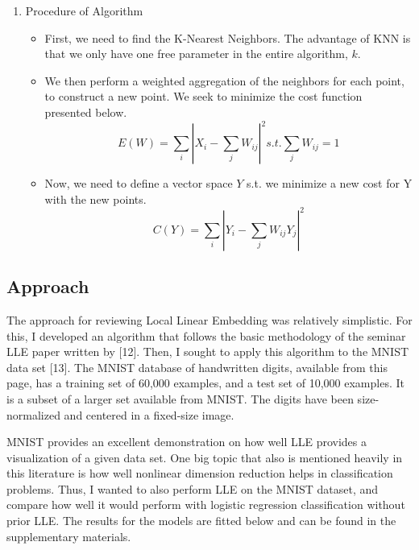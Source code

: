 \documentclass[11pt]{article}
\begin{document}
\begin{enumerate}
    \item Procedure of Algorithm
    \begin{itemize}
        \item First, we need to find the K-Nearest Neighbors. The advantage of KNN is that we only have one free parameter in the entire algorithm, $k.$
        \item We then perform a weighted aggregation of the neighbors for each point, to construct a new point. We seek to minimize the cost function presented below.
        \begin{equation}
            E(W)=\sum\limits_i|X_i-\sum\limits_jW_{ij}|^2 s.t. \sum\limits_jW_{ij}=1
        \end{equation}
        \item Now, we need to define a vector space $Y$ s.t. we minimize a new cost for Y with the new points.
        \begin{equation}
            C(Y)=\sum\limits_i|Y_i-\sum\limits_jW_{ij}Y_j|^2
        \end{equation}
    \end{itemize}
\end{enumerate}

\subsection{Approach}
\hspace{5mm}The approach for reviewing Local Linear Embedding was relatively simplistic. For this, I developed an algorithm that follows the basic methodology of the seminar LLE paper written by [12]. Then, I sought to apply this algorithm to the MNIST data set [13]. The MNIST database of handwritten digits, available from this page, has a training set of 60,000 examples, and a test set of 10,000 examples. It is a subset of a larger set available from MNIST. The digits have been size-normalized and centered in a fixed-size image.

MNIST provides an excellent demonstration on how well LLE provides a visualization of a given data set. One big topic that also is mentioned heavily in this literature is how well nonlinear dimension reduction helps in classification problems. Thus, I wanted to also perform LLE on the MNIST dataset, and compare how well it would perform with logistic regression classification without prior LLE. The results for the models are fitted below and can be found in the supplementary materials.
\end{document}
